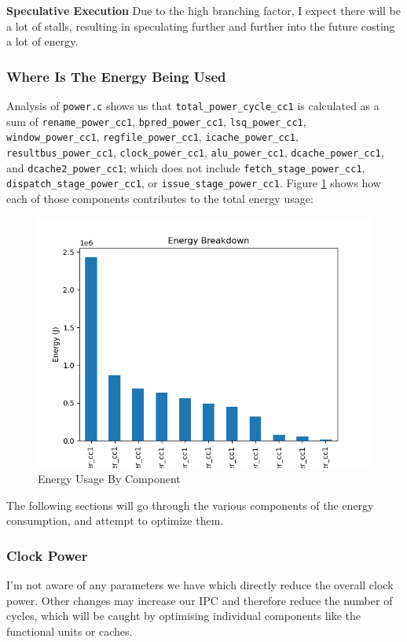 \documentclass{article}
\begin{document}
\begin{multicols}{2}
  \textbf{Speculative Execution} Due to the high branching factor, I expect there will be a lot of stalls, resulting in speculating further and further into the future costing a lot of energy.

  \subsubsection{Where Is The Energy Being Used}
  Analysis of \verb|power.c| shows us that \verb|total_power_cycle_cc1| is calculated as a sum of \verb|rename_power_cc1|, \verb|bpred_power_cc1|, \verb|lsq_power_cc1|, \verb|window_power_cc1|, \verb|regfile_power_cc1|, \verb|icache_power_cc1|, \verb|resultbus_power_cc1|, \verb|clock_power_cc1|, \verb|alu_power_cc1|, \verb|dcache_power_cc1|, and \verb|dcache2_power_cc1|; which does not include \verb|fetch_stage_power_cc1|, \verb|dispatch_stage_power_cc1|, or \verb|issue_stage_power_cc1|. Figure \ref{fig:energy_breakdown} shows how each of those components contributes to the total energy usage:

  \begin{figure}[H]
    \centering
    \includegraphics[width=\linewidth]{./assets/energy_breakdown.png}
    \caption{Energy Usage By Component}
    \label{fig:energy_breakdown}
  \end{figure}

  The following sections will go through the various components of the energy consumption, and attempt to optimize them.

  \subsubsection{Clock Power}
  I'm not aware of any parameters we have which directly reduce the overall clock power. Other changes may increase our IPC and therefore reduce the number of cycles, which will be caught by optimising individual components like the functional units or caches.


\end{multicols}
\end{document}

